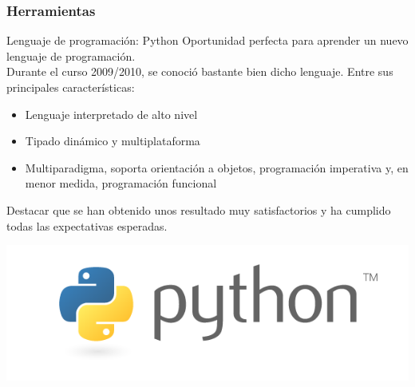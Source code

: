 \begin{frame}
    \frametitle{Herramientas}

        \begin{block}{Lenguaje de programación: Python}
        Oportunidad perfecta para aprender un nuevo lenguaje de programación.\\
        Durante el curso 2009/2010, se conoció bastante bien dicho lenguaje. Entre sus principales características:
            \begin{itemize}
                \item Lenguaje interpretado de alto nivel
                \item Tipado dinámico y multiplataforma
                \item Multiparadigma, soporta orientación a objetos, programación imperativa y, 
                en menor medida, programación funcional
            \end{itemize}
            Destacar que se han obtenido unos resultado muy satisfactorios y ha cumplido todas las expectativas esperadas.

        \end{block}

        \begin{center}
                \includegraphics[scale=0.3]{imagenes/logo_python.png}
        \end{center}

\end{frame}

